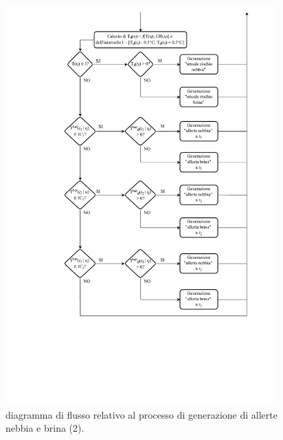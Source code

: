 \begin{figure}[h!]
	\centering
	\includegraphics[height=580px]{FlowChartsFiles/Allerte_nebbia_&_brina_2.pdf}
	\caption[Diagramma di flusso relativo al processo di generazione di allerte nebbia e brina (2)]{diagramma di flusso relativo al processo di generazione di allerte nebbia e brina (2).}
	\label{Allerta_nebbia_&_brina_2}
\end{figure}

